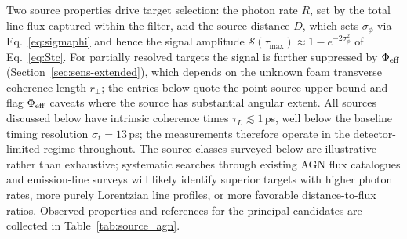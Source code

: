 \documentclass[aps,prd,onecolumn,amsmath,amssymb]{revtex4-2}
\begin{document}
Two source properties drive target selection: the photon rate $R$, set by
the total line flux captured within the filter, and the source distance
$D$, which sets $\sigma_\phi$ via Eq.~\eqref{eq:sigmaphi} and hence the
signal amplitude $\mathcal{S}(\tau_{\max}) \approx 1-e^{-2\sigma_\phi^2}$
of Eq.~\eqref{eq:Stc}.  For partially resolved targets the signal is
further suppressed by $\Phi_{\rm eff}$ (Section~\ref{sec:sens-extended}),
which depends on the unknown foam transverse coherence length $r_\perp$;
the entries below quote the point-source upper bound and flag $\Phi_{\rm eff}$
caveats where the source has substantial angular extent.
All sources discussed below have intrinsic coherence times $\tau_L \lesssim 1$\,ps,
well below the baseline timing resolution $\sigma_t = 13$\,ps; the measurements
therefore operate in the detector-limited regime throughout.
The source classes surveyed below are illustrative rather than exhaustive;
systematic searches through existing AGN flux catalogues and emission-line
surveys will likely identify superior targets with higher photon rates,
more purely Lorentzian line profiles, or more favorable distance-to-flux ratios.
Observed properties and references for the principal candidates are collected
in Table~\ref{tab:source_agn}.
\end{document}
